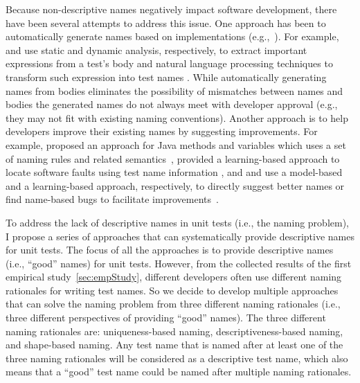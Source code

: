 Because non-descriptive names negatively impact software development, there have been several attempts to address this issue.
%
One approach has been to automatically generate names based on implementations (e.g.,~\cite{arcuri2014automated, zhang2015automatically, daka2017generating}).
%
For example, \citeauthor{zhang2015automatically} and \citeauthor{daka2017generating} use static and dynamic analysis, respectively, to extract important expressions from a test's body and natural language processing techniques to transform such expression into test names \cite{zhang2015automatically, daka2017generating}. 
%
While automatically generating names from bodies eliminates the possibility of mismatches between names and bodies the generated names do not always meet with developer approval (e.g., they may not fit with existing naming conventions).
%
Another approach is to help developers improve their existing names by suggesting improvements.
%
For example, \citeauthor{host2009debugging} proposed an approach for Java methods and variables which uses a set of naming rules and related semantics~\cite{host2009debugging}, \citeauthor{li2019deepfl} provided a learning-based approach to locate software faults using test name information \cite{li2019deepfl}, and \citeauthor{allamanis2015suggesting} and \citeauthor{pradel2018deepbugs} use a model-based and a learning-based approach, respectively, to directly suggest better names or find name-based bugs to facilitate improvements~\cite{allamanis2015suggesting, pradel2018deepbugs}.


To address the lack of descriptive names in unit tests (i.e., the naming problem), I propose a series of approaches that can systematically provide descriptive names for unit tests.
%
The focus of all the approaches is to provide descriptive names (i.e., \enquote{good} names) for unit tests.
%
However, from the collected results of the first empirical study~\cref{sec:empStudy}, different developers often use different naming rationales for writing test names.
%
So we decide to develop multiple approaches that can solve the naming problem from three different naming rationales (i.e., three different perspectives of providing \enquote{good} names).
%
The three different naming rationales are: uniqueness-based naming, descriptiveness-based naming, and shape-based naming.
%
Any test name that is named after at least one of the three naming rationales will be considered as a descriptive test name, which also means that a \enquote{good} test name could be named after multiple naming rationales.



